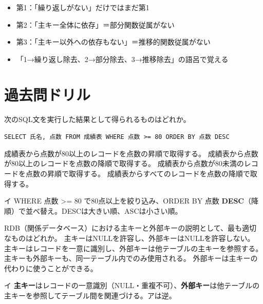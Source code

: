 \begin{pitfall}[正規化のレベルを混同]
\begin{itemize}
  \item 第1：「繰り返しがない」だけではまだ第1
  \item 第2：「主キー全体に依存」＝部分関数従属がない
  \item 第3：「主キー以外への依存もない」＝推移的関数従属がない
  \item 「1→繰り返し除去、2→部分除去、3→推移除去」の語呂で覚える
\end{itemize}
\end{pitfall}

\section{過去問ドリル}


\begin{itpmon}{%
次のSQL文を実行した結果として得られるものはどれか。

\texttt{SELECT 氏名, 点数 FROM 成績表 WHERE 点数 >= 80 ORDER BY 点数 DESC}}
\sentakushi
  {成績表から点数が80以上のレコードを点数の昇順で取得する。}
  {成績表から点数が80以上のレコードを点数の降順で取得する。}
  {成績表から点数が80未満のレコードを点数の昇順で取得する。}
  {成績表からすべてのレコードを点数の降順で取得する。}
\end{itpmon}
\begin{kaisetsu}{イ}
WHERE 点数 >= 80 で80点以上を絞り込み、ORDER BY 点数 \textbf{DESC}（降順）で並べ替え。DESCは大きい順、ASCは小さい順。
\end{kaisetsu}

\begin{itpmon}{%
RDB（関係データベース）における主キーと外部キーの説明として、最も適切なものはどれか。}
\sentakushi
  {主キーはNULLを許容し、外部キーはNULLを許容しない。}
  {主キーはレコードを一意に識別し、外部キーは他テーブルの主キーを参照する。}
  {主キーも外部キーも、同一テーブル内でのみ使用される。}
  {外部キーは主キーの代わりに使うことができる。}
\end{itpmon}
\begin{kaisetsu}{イ}
\textbf{主キー}はレコードの一意識別（NULL・重複不可）、\textbf{外部キー}は他テーブルの主キーを参照してテーブル間を関連づける。アは逆。
\end{kaisetsu}

